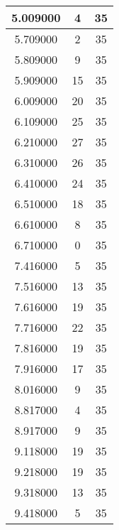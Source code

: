 \begin{longtable}[htbp]{|c|c|c|}
5.009000 & 4 & 35 \\ \hline
5.709000 & 2 & 35 \\ \hline
5.809000 & 9 & 35 \\ \hline
5.909000 & 15 & 35 \\ \hline
6.009000 & 20 & 35 \\ \hline
6.109000 & 25 & 35 \\ \hline
6.210000 & 27 & 35 \\ \hline
6.310000 & 26 & 35 \\ \hline
6.410000 & 24 & 35 \\ \hline
6.510000 & 18 & 35 \\ \hline
6.610000 & 8 & 35 \\ \hline
6.710000 & 0 & 35 \\ \hline
7.416000 & 5 & 35 \\ \hline
7.516000 & 13 & 35 \\ \hline
7.616000 & 19 & 35 \\ \hline
7.716000 & 22 & 35 \\ \hline
7.816000 & 19 & 35 \\ \hline
7.916000 & 17 & 35 \\ \hline
8.016000 & 9 & 35 \\ \hline
8.817000 & 4 & 35 \\ \hline
8.917000 & 9 & 35 \\ \hline
9.118000 & 19 & 35 \\ \hline
9.218000 & 19 & 35 \\ \hline
9.318000 & 13 & 35 \\ \hline
9.418000 & 5 & 35 \\ \hline
\end{longtable}
